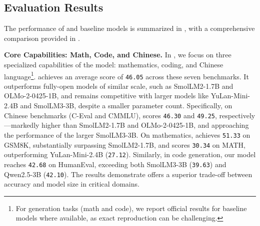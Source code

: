 \subsection{Evaluation Results}

The performance of \sys and baseline models is summarized in , with a comprehensive comparison provided in .

\begin{table}[!htbp]
\centering
\caption{Core Capabilities: Chinese, Math, and Code.}
\label{tab:lang_math_code}
\end{table}

\textbf{Core Capabilities: Math, Code, and Chinese.} 
In , we focus on three specialized capabilities of the model: mathematics, coding, and Chinese language\footnote{For generation tasks (math and code), we report official results for baseline models where available, as exact reproduction can be challenging.}. \sys achieves an average score of \texttt{46.05} across these seven benchmarks. It outperforms fully-open models of similar scale, such as SmolLM2-1.7B and OLMo-2-0425-1B, and remains competitive with larger models like YuLan-Mini-2.4B and SmolLM3-3B, despite a smaller parameter count.
Specifically, on Chinese benchmarks (C-Eval and CMMLU), \sys scores \texttt{46.30} and \texttt{49.25}, respectively—markedly higher than SmolLM2-1.7B and OLMo-2-0425-1B, and approaching the performance of the larger SmolLM3-3B. On mathematics, \sys achieves \texttt{51.33} on GSM8K, substantially surpassing SmolLM2-1.7B, and scores \texttt{30.34} on MATH, outperforming YuLan-Mini-2.4B (\texttt{27.12}). Similarly, in code generation, our model reaches \texttt{42.68} on HumanEval, exceeding both SmolLM3-3B (\texttt{39.63}) and Qwen2.5-3B (\texttt{42.10}). The results demonstrate \sys offers a superior trade-off between accuracy and model size in critical domains.


